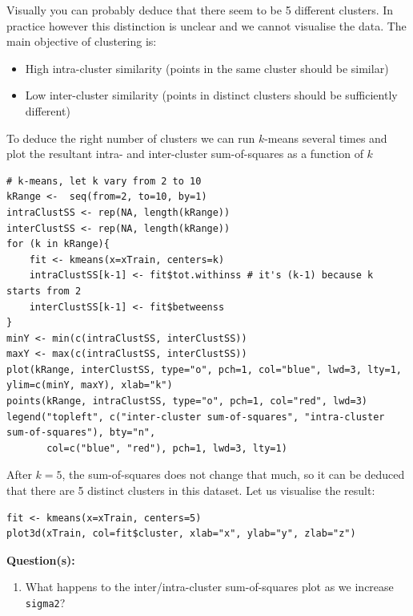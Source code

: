 \documentclass[a4paper,11pt]{article}
\begin{document}
Visually you can probably deduce that there seem to be 5 different clusters. In 
practice however this distinction is unclear and we cannot visualise the data.
The main objective of clustering is:

\begin{itemize}
	\item High intra-cluster similarity (points in the same cluster should be similar)
	\item Low inter-cluster similarity (points in distinct clusters should be sufficiently different)
\end{itemize}

To deduce the right number of clusters we can run $k$-means several times and plot
the resultant intra- and inter-cluster sum-of-squares as a function of $k$
\vspace{0.4cm}
\begin{lstlisting}[style=RCode]
# k-means, let k vary from 2 to 10
kRange <-  seq(from=2, to=10, by=1)
intraClustSS <- rep(NA, length(kRange))  
interClustSS <- rep(NA, length(kRange))
for (k in kRange){
    fit <- kmeans(x=xTrain, centers=k)
    intraClustSS[k-1] <- fit$tot.withinss # it's (k-1) because k starts from 2
    interClustSS[k-1] <- fit$betweenss
}
minY <- min(c(intraClustSS, interClustSS))
maxY <- max(c(intraClustSS, interClustSS))
plot(kRange, interClustSS, type="o", pch=1, col="blue", lwd=3, lty=1, ylim=c(minY, maxY), xlab="k")
points(kRange, intraClustSS, type="o", pch=1, col="red", lwd=3)
legend("topleft", c("inter-cluster sum-of-squares", "intra-cluster sum-of-squares"), bty="n",
       col=c("blue", "red"), pch=1, lwd=3, lty=1)
\end{lstlisting}

After $k=5$, the sum-of-squares does not change that much, so it can be deduced that
there are 5 distinct clusters in this dataset. Let us visualise the result:
\\
\begin{lstlisting}[style=RCode]
fit <- kmeans(x=xTrain, centers=5)
plot3d(xTrain, col=fit$cluster, xlab="x", ylab="y", zlab="z")
\end{lstlisting}

\begin{framed}
\textbf{Question(s):}
\begin{enumerate}
	\item What happens to the inter/intra-cluster sum-of-squares plot as we increase \texttt{sigma2}?
\end{enumerate}
\end{framed}
\end{document}
